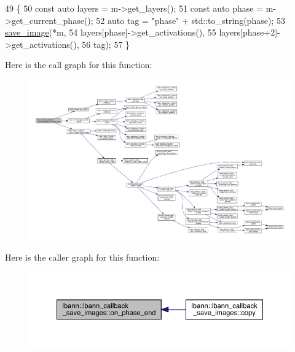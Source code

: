 \begin{DoxyCode}
49                                                       \{
50   \textcolor{keyword}{const} \textcolor{keyword}{auto} layers = m->get\_layers();
51   \textcolor{keyword}{const} \textcolor{keyword}{auto} phase = m->get\_current\_phase();
52   \textcolor{keyword}{auto} tag = \textcolor{stringliteral}{"phase"} + std::to\_string(phase);
53   \hyperlink{classlbann_1_1lbann__callback__save__images_ab84c4d511a4614ca90644d12dc77edee}{save\_image}(*m,
54              layers[phase]->get\_activations(),
55              layers[phase+2]->get\_activations(),
56              tag);
57 \}
\end{DoxyCode}
Here is the call graph for this function\+:\nopagebreak
\begin{figure}[H]
\begin{center}
\leavevmode
\includegraphics[width=350pt]{classlbann_1_1lbann__callback__save__images_a4591438de0b52467988e2bd34b55c0dd_cgraph}
\end{center}
\end{figure}
Here is the caller graph for this function\+:\nopagebreak
\begin{figure}[H]
\begin{center}
\leavevmode
\includegraphics[width=350pt]{classlbann_1_1lbann__callback__save__images_a4591438de0b52467988e2bd34b55c0dd_icgraph}
\end{center}
\end{figure}
\mbox{\label{classlbann_1_1lbann__callback__save__images_a44d0f0113133d6fd8944d8b7702ea786}} 
